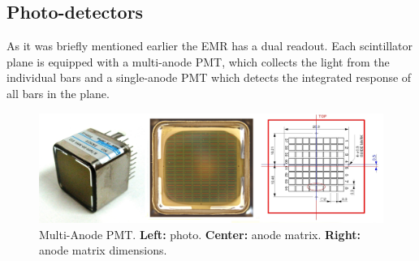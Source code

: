 \documentclass[a4paper,11pt]{article}
\begin{document}
\subsection{Photo-detectors}
As it was briefly mentioned earlier the EMR has a dual readout. Each scintillator plane is equipped with a multi-anode PMT, which collects
the light from the individual bars and a single-anode PMT which detects the integrated response of all bars in the plane. 
\begin{figure}[h]
 \centering
 \includegraphics[width=\textwidth]{./mapmt}
 \caption[Multi-Anode PMT]{Multi-Anode PMT. {\bf Left:} photo. {\bf Center:} anode matrix. {\bf Right:} anode matrix dimensions.}
 \label{fig:mapmt}
\end{figure}
\end{document}

